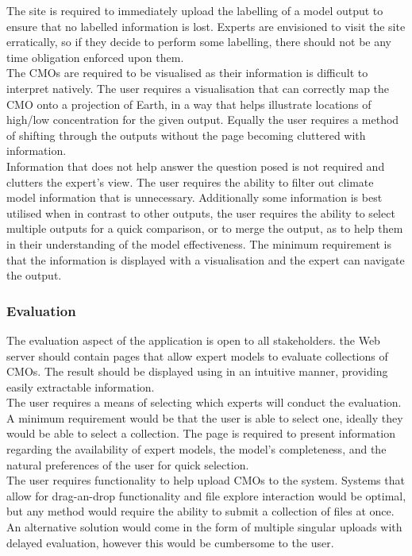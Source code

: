 \documentclass{ecmm427_assignment}
\begin{document}
\quad The site is required to immediately upload the labelling of a model output to ensure that no labelled information is lost. Experts are envisioned to visit the site erratically, so if they decide to perform some labelling, there should not be any time obligation enforced upon them.\\

\quad The CMOs are required to be visualised as their information is difficult to interpret natively. The user requires a visualisation that can correctly map the CMO onto a projection of Earth, in a way that helps illustrate locations of high/low concentration for the given output. Equally the user requires a method of shifting through the outputs without the page becoming cluttered with information.\\

\quad Information that does not help answer the question posed is not required and clutters the expert's view. The user requires the ability to filter out climate model information that is unnecessary. Additionally some information is best utilised when in contrast to other outputs, the user requires the ability to select multiple outputs for a quick comparison, or to merge the output, as to help them in their understanding of the model effectiveness. The minimum requirement is that the information is displayed with a visualisation and the expert can navigate the output. 

\subsubsection{Evaluation}

\quad The evaluation aspect of the application is open to all stakeholders. the Web server should contain pages that allow expert models to evaluate collections of CMOs. The result should be displayed using in an intuitive manner, providing easily extractable information.\\

\quad The user requires a means of selecting which experts will conduct the evaluation. A minimum requirement would be that the user is able to select one, ideally they would be able to select a collection. The page is required to present information regarding the availability of expert models, the model's completeness, and the natural preferences of the user for quick selection.\\

\quad The user requires functionality to help upload CMOs to the system. Systems that allow for drag-an-drop functionality and file explore interaction would be optimal, but any method would require the ability to submit a collection of files at once. An alternative solution would come in the form of multiple singular uploads with delayed evaluation, however this would be cumbersome to the user.\\
\end{document}
